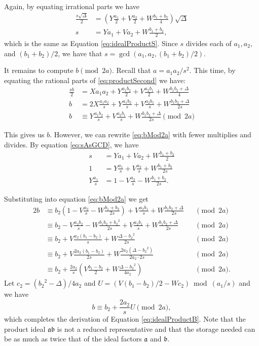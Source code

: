 \documentclass{ucalgthes1}
\theoremstyle{definition}
\begin{document}
\noindent
Again, by equating irrational parts we have
\begin{align}
	\frac{s\sqrt\Delta}{2} & = \left(Y\frac{a_1}{2} + V\frac{a_2}{2} + W\frac{b_1+b_2}{4}\right)\sqrt\Delta \nonumber \\
	s & = Ya_1 + Va_2 + W\frac{b_1+b_2}{2}, \label{eq:sAsGCD}
\end{align}
which is the same as Equation \ref{eq:idealProductS}.  Since $s$ divides each of $a_1, a_2,$ and $(b_1+b_2)/2$, we have that $s = \gcd(a_1, a_2, (b_1+b_2)/2)$.

It remains to compute $b \pmod{2a}$.  Recall that $a = a_1a_2/s^2$.  This time, by equating the rational parts of \eqref{eq:productSecond} we have:
\begin{align}
	\frac{sb}{2} & = Xa_1a_2 + Y\frac{a_1b_2}{2} + V\frac{a_2b_1}{2} + W\frac{b_1b_2 + \Delta}{4} \nonumber \\
	b & = 2X\frac{a_1a_2}{s} + Y\frac{a_1b_2}{s} + V\frac{a_2b_1}{s} + W\frac{b_1b_2 + \Delta}{2s} \nonumber \\
	b & \equiv Y\frac{a_1b_2}{s} + V\frac{a_2b_1}{s} + W\frac{b_1b_2 + \Delta}{2s} \pmod{2a} \label{eq:bMod2a}
\end{align}

\noindent
This gives us $b$.  However, we can rewrite \eqref{eq:bMod2a} with fewer multiplies and divides.  By equation \eqref{eq:sAsGCD}, we have
\begin{align*}
	s & = Ya_1 + Va_2 + W\frac{b_1+b_2}{2} \\
	1 & = Y\frac{a_1}{s} + V\frac{a_2}{s} + W\frac{b_1+b_2}{2s} \\
	Y\frac{a_1}{s} & = 1 - V\frac{a_2}{s} - W\frac{b_1+b_2}{2s}.
\end{align*}

\noindent
Substituting into equation \eqref{eq:bMod2a} we get
\begin{alignat*}{2}
	b & \equiv b_2(1-V\frac{a_2}{s} - W\frac{b_1+b_2}{2s}) + V\frac{a_2b_1}{s} + W\frac{b_1b_2 + \Delta}{2s} && \pmod{2a} \\
	& \equiv b_2 - V\frac{a_2b_2}{s} - W\frac{b_1b_2+{b_2}^2}{2s} + V\frac{a_2b_1}{s} + W\frac{b_1b_2 + \Delta}{2s} && \pmod{2a} \\
	& \equiv b_2 + V\frac{a_2(b_1-b_2)}{s} + W\frac{\Delta - {b_2}^2}{2s} && \pmod{2a} \\
	& \equiv b_2 + V\frac{2a_2(b_1-b_2)}{2s} + W\frac{2a_2(\Delta - {b_2}^2)}{2a_2 \cdot 2s} && \pmod{2a} \\
	& \equiv b_2 + \frac{2a_2}{s} \left( V\frac{b_1-b_2}{2} + W\frac{\Delta - {b_2}^2}{4a_2} \right) && \pmod{2a}.
\end{alignat*}
Let $c_2 = ({b_2}^2 - \Delta)/4a_2$ and $U = (V(b_1-b_2)/2 - Wc_2) \bmod{(a_1/s)}$ and we have
\[
	b \equiv b_2 + \frac{2a_2}{s} U \pmod{2a},
\]
which completes the derivation of Equation \ref{eq:idealProductB}.  Note that the product ideal $\mathfrak a \mathfrak b$ is not a reduced representative and that the storage needed can be as much as twice that of the ideal factors $\mathfrak a$ and $\mathfrak b$.
\end{document}
